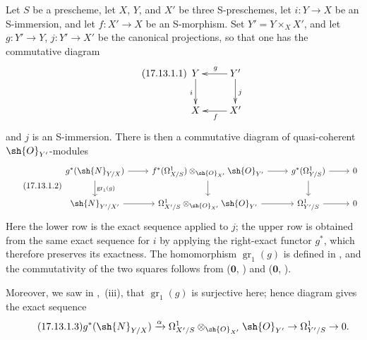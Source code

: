 \begin{env}[17.13.1]
\label{IV.17.13.1}
Let $S$ be a prescheme, let $X$, $Y$, and $X'$ be three S-preschemes, let $i:Y\to X$ be an S-immersion, and let $f:X'\to X$ be an S-morphism.
Set $Y'=Y\times_X X'$, and let $g:Y'\to Y$, $j:Y'\to X'$ be the canonical projections, so that one has the commutative diagram
\[
\label{IV.17.13.1.1}
\tag{17.13.1.1}
\xymatrix{
  Y \ar[d]_i & Y' \ar[l]_g \ar[d]^j\\
  X & X' \ar[l]^f
}
\]
and $j$ is an S-immersion.
There is then a commutative diagram of quasi-coherent $\sh{O}_{Y'}$-modules
\[
\label{IV.17.13.1.2}
\tag{17.13.1.2}
\begin{tikzcd}
  g^*(\sh{N}_{Y/X}) \ar{r} \ar{d}{\operatorname{gr}_1(g)} & f^*(\Omega^1_{X/S})\otimes_{\sh{O}_{X'}} \sh{O}_{Y'} \ar{r} \ar{d} & g^*(\Omega^1_{Y/S}) \ar{r} \ar{d} & 0 \\
  \sh{N}_{Y'/X'} \ar{r} & \Omega^1_{X'/S}\otimes_{\sh{O}_{X'}} \sh{O}_{Y'} \ar{r} & \Omega^1_{Y'/S} \ar{r} & 0
\end{tikzcd}
\]
Here the lower row is the exact sequence  applied to $j$; the upper row is obtained from the same exact sequence for $i$ by applying the right-exact functor $g^*$, which therefore preserves its exactness.
The homomorphism $\operatorname{gr}_1(g)$ is defined in , and the commutativity of the two squares follows from ($\mathbf{0}$, ) and ($\mathbf{0}$, ).


Moreover, we saw in ,~(iii), that $\operatorname{gr}_1(g)$ is surjective here; hence diagram  gives the exact sequence
\[
\label{IV.17.13.1.3}
\tag{17.13.1.3}
  g^*(\sh{N}_{Y/X}) \xrightarrow{\alpha} \Omega^1_{X'/S}\otimes_{\sh{O}_{X'}} \sh{O}_{Y'} \to \Omega^1_{Y'/S} \to 0.
\]
\end{env}

